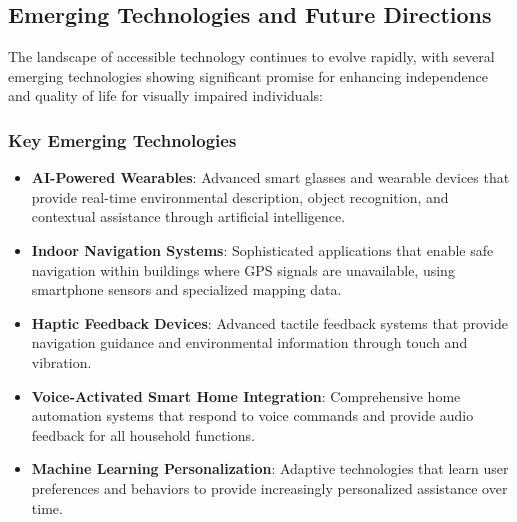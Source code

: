 \subsection{Emerging Technologies and Future Directions}\label{emerging-tech}
The landscape of accessible technology continues to evolve rapidly, with several emerging technologies showing significant promise for enhancing independence and quality of life for visually impaired individuals:

\subsubsection{Key Emerging Technologies}

\begin{itemize}

 \item \textbf{AI-Powered Wearables}: Advanced smart glasses and wearable devices that provide real-time environmental description, object recognition, and contextual assistance through artificial intelligence.
 \item \textbf{Indoor Navigation Systems}: Sophisticated applications that enable safe navigation within buildings where GPS signals are unavailable, using smartphone sensors and specialized mapping data.
 \item \textbf{Haptic Feedback Devices}: Advanced tactile feedback systems that provide navigation guidance and environmental information through touch and vibration.
 \item \textbf{Voice-Activated Smart Home Integration}: Comprehensive home automation systems that respond to voice commands and provide audio feedback for all household functions.
 \item \textbf{Machine Learning Personalization}: Adaptive technologies that learn user preferences and behaviors to provide increasingly personalized assistance over time.

\end{itemize}

